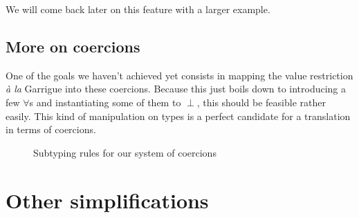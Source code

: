 \documentclass[10pt,a4paper,twoside,titlepage,twocolumn]{article}
\begin{document}
We will come back later on this feature with a larger example.

\subsection{More on coercions}

One of the goals we haven't achieved yet consists in mapping the value
restriction \emph{à la} Garrigue into these coercions. Because this just boils
down to introducing a few $\forall$s and instantiating some of them to $\perp$,
this should be feasible rather easily. This kind of manipulation on types is
a perfect candidate for a translation in terms of coercions.

\begin{figure*}[t!]
  \TTtoprule
  \TTbottomrule
  \caption{\label{fig:subtyping_rules}Subtyping rules for our system of coercions}
\end{figure*}

\section{Other simplifications\label{desugar}}
\end{document}
